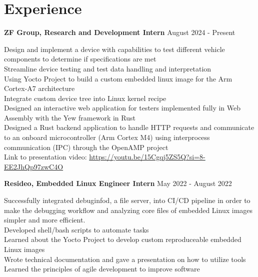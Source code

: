 \documentclass[letter,12pt]{article}
\begin{document}
\vspace{-1.0cm}
\section*{Experience} 
\begin{tcolorbox}
[colback=gray!25,
  leftrule=0pt,
  rightrule=0pt,
  sharp corners]
\textbf{ZF Group, Research and Development Intern} \hfill August 2024 - Present 
\end{tcolorbox}
\noindent\textbullet \- Design and implement a device with capabilities to test different vehicle components to determine if specifications are met\\
\textbullet \- Streamline device testing and test data handling and interpretation\\
\textbullet \- Using Yocto Project to build a custom embedded linux image for the Arm Cortex-A7 architecture \\
\textbullet \- Integrate custom device tree into Linux kernel recipe \\
\textbullet \- Designed an interactive web application for testers implemented fully in Web Assembly with the Yew framework in Rust \\
\textbullet \- Designed a Rust backend application to handle HTTP requests and communicate to an onboard microcontroller (Arm Cortex M4)
using interprocess communication (IPC) through the OpenAMP project\\
\textbullet \- Link to presentation video:
{\textcolor{cyan}{\underline{\url{https://youtu.be/15Cgqj5ZS5Q?si=8-EE2JhQp97zwC4O}}}}
\begin{tcolorbox}
[colback=gray!25,
  leftrule=0pt,
  rightrule=0pt,
  sharp corners]
\noindent\textbf{Resideo, Embedded Linux
Engineer Intern} \hfill May 2022 - August 2022 
\end{tcolorbox}
\noindent\textbullet \- Successfully integrated
debuginfod, a file server, into CI/CD pipeline in order to make the debugging
workflow and analyzing core files of embedded Linux images simpler and more
efficient.\\
\textbullet \- Developed shell/bash scripts to automate tasks\\
\textbullet \- Learned about the Yocto Project to develop custom reproduceable 
embedded Linux images\\
\textbullet \- Wrote technical documentation and gave a presentation on 
how to utilize tools\\
\textbullet \- Learned the principles of agile development to improve software 
\end{document}

